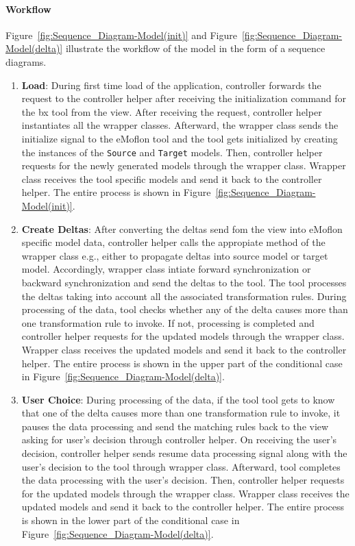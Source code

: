 \paragraph{Workflow}
Figure~\ref{fig:Sequence_Diagram-Model(init)} and  Figure~\ref{fig:Sequence_Diagram-Model(delta)} illustrate the workflow of the model in the form of a sequence diagrams.

\begin{enumerate}
	\item {\textbf{Load}: During first time load of the application, controller forwards the request to the controller helper after receiving the initialization command for the bx tool from the view. After receiving the request, controller helper instantiates all the wrapper classes. Afterward, the wrapper class sends the initialize signal to the eMoflon tool and the tool gets initialized by creating the instances of the \texttt{Source} and \texttt{Target} models. Then, controller helper requests for the newly generated models through the wrapper class. Wrapper class receives the tool specific models and send it back to the controller helper. The entire process is shown in Figure~\ref{fig:Sequence_Diagram-Model(init)}.}
	
	\item {\textbf{Create Deltas}: After converting the deltas send fom the view into eMoflon specific model data, controller helper calls the appropiate method of the wrapper class e.g., either to propagate deltas into source model or target model. Accordingly, wrapper class intiate forward synchronization or backward synchronization and send the deltas to the tool. The tool processes the deltas taking into account all the associated transformation rules. During processing of the data, tool checks whether any of the delta causes more than one transformation rule to invoke. If not, processing is completed and controller helper requests for the updated models through the wrapper class. Wrapper class receives the updated models and send it back to the controller helper. The entire process is shown in the upper part of the conditional case in Figure~\ref{fig:Sequence_Diagram-Model(delta)}.}
	
	\item {\textbf{User Choice}: During processing of the data, if the tool tool gets to know that one of the delta causes more than one transformation rule to invoke, it pauses the data processing and send the matching rules back to the view asking for user's decision through controller helper. On receiving the user's decision, controller helper sends resume data processing signal along with the user's decision to the tool through wrapper class. Afterward, tool completes the data processing with the user's decision. Then, controller helper requests for the updated models through the wrapper class. Wrapper class receives the updated models and send it back to the controller helper. The entire process is shown in the lower part of the conditional case in Figure~\ref{fig:Sequence_Diagram-Model(delta)}.}
\end{enumerate}

